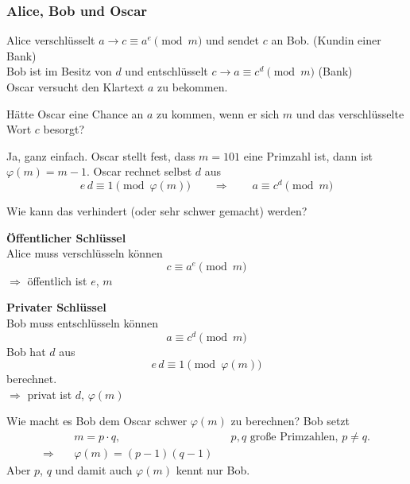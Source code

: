 \subsubsection*{Alice, Bob und Oscar}

Alice verschlüsselt $a \to c \equiv a^e \pmod{m}$ und sendet $c$ an Bob. \hfill (Kundin einer Bank)\\
Bob ist im Besitz von $d$ und entschlüsselt $c \to a \equiv c^d \pmod{m}$ \hfill (Bank)\\
Oscar versucht den Klartext $a$ zu bekommen.

\begin{beispiel}
Hätte Oscar eine Chance an $a$ zu kommen, wenn er sich $m$ und das verschlüsselte Wort $c$ besorgt?

Ja, ganz einfach. Oscar stellt fest, dass $m = 101$ eine Primzahl ist, dann ist $\varphi(m) = m - 1$. Oscar rechnet selbst $d$ aus
\[
  e\,d \equiv 1 \pmod{\varphi(m)} \qquad \Rightarrow \qquad a \equiv c^d \pmod{m}
\]
\end{beispiel}

Wie kann das verhindert (oder sehr schwer gemacht) werden?

\begin{definition}
\textbf{Öffentlicher Schlüssel}\\
Alice muss verschlüsseln können
\[
  c \equiv a^e \pmod{m}
\]
$\Rightarrow$ \quad öffentlich ist $e$, $m$

\textbf{Privater Schlüssel}\\
Bob muss entschlüsseln können
\[
  a \equiv c^d \pmod{m}
\]
Bob hat $d$ aus
\[
  e\,d \equiv 1 \pmod{\varphi(m)}
\]
berechnet.\\
$\Rightarrow$ \quad privat ist $d$, $\varphi(m)$
\end{definition}

Wie macht es Bob dem Oscar schwer $\varphi(m)$ zu berechnen? Bob setzt
\begin{align*}
  & m = p \cdot q, && p, q \text{ große Primzahlen, } p \neq q. \\
  \Rightarrow\quad & \varphi(m) = (p - 1)(q - 1)
\end{align*}
Aber $p$, $q$ und damit auch $\varphi(m)$ kennt nur Bob.

